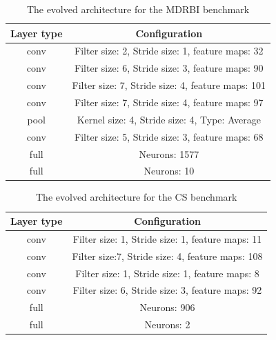 \documentclass[conference]{IEEEtran}
\begin{document}
\begin{table}[!t]
	\renewcommand{\arraystretch}{1.3}
	\caption{The evolved architecture for the MDRBI benchmark}
	\label{table:EvolvedMDRBICNN}
	\centering
	\begin{tabular}{|c|c|}
		\hline
		Layer type & Configuration\\
		\hline
		conv & Filter size: 2, Stride size: 1, feature maps: 32\\
		\hline
		conv & Filter size: 6, Stride size: 3, feature maps: 90\\
		\hline
		conv & Filter size: 7, Stride size: 4, feature maps: 101\\
		\hline
		conv & Filter size: 7, Stride size: 4, feature maps: 97\\
		\hline
		pool & Kernel size: 4, Stride size: 4, Type: Average\\
		\hline
		conv & Filter size: 5, Stride size: 3, feature maps: 68\\
		\hline
		full & Neurons: 1577\\
		\hline
		full & Neurons: 10\\
		\hline
	\end{tabular}
\end{table}

\begin{table}[!t]
	\renewcommand{\arraystretch}{1.3}
	\caption{The evolved architecture for the CS benchmark}
	\label{table:EvolvedConvexCNN}
	\centering
	\begin{tabular}{|c|c|}
		\hline
		Layer type & Configuration\\
		\hline
		conv & Filter size: 1, Stride size: 1, feature maps: 11\\
		\hline
		conv & Filter size:7, Stride size: 4, feature maps: 108\\
		\hline
		conv & Filter size: 1, Stride size: 1, feature maps: 8\\
		\hline
		conv & Filter size: 6, Stride size: 3, feature maps: 92\\
		\hline
		full & Neurons: 906\\
		\hline
		full & Neurons: 2\\
		\hline
	\end{tabular}
\end{table}
\end{document}

